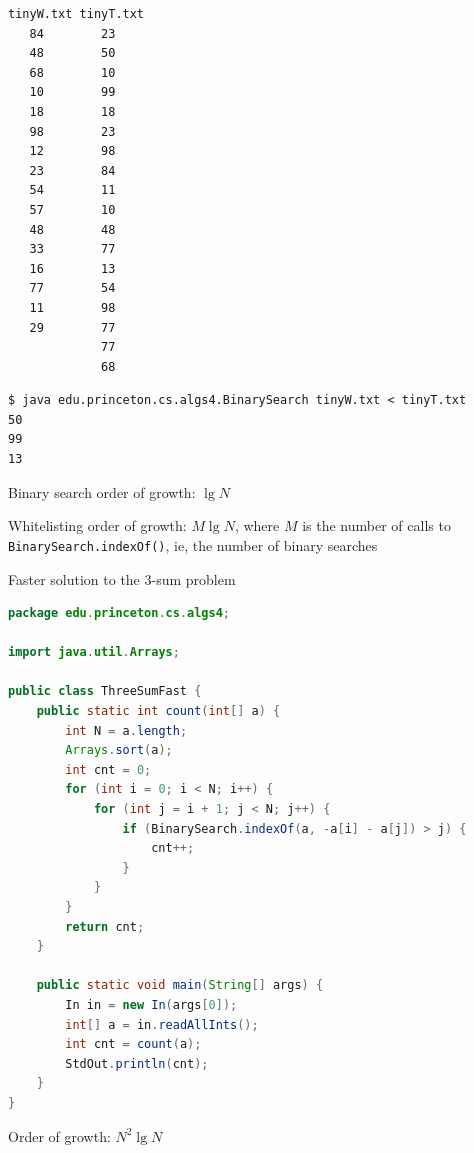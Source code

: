 \documentclass[8pt,a4paper,compress]{beamer}
\begin{document}
\begin{frame}[fragile]
\pause

\begin{lstlisting}[language={}]
tinyW.txt tinyT.txt
   84        23
   48        50
   68        10
   10        99
   18        18
   98        23
   12        98
   23        84
   54        11
   57        10
   48        48
   33        77
   16        13
   77        54
   11        98
   29        77
             77
             68
\end{lstlisting}

\pause

\begin{lstlisting}[language={}]
$ java edu.princeton.cs.algs4.BinarySearch tinyW.txt < tinyT.txt
50
99
13
\end{lstlisting}

\pause
\bigskip

Binary search order of growth: $\lg N$ 

\pause
\bigskip

Whitelisting order of growth: $M\lg N$, where $M$ is the number of calls to \lstinline{BinarySearch.indexOf()}, ie, the number of binary searches
\end{frame}

\begin{frame}[fragile]
\pause

Faster solution to the 3-sum problem
\begin{lstlisting}[language=Java]
package edu.princeton.cs.algs4;

import java.util.Arrays;

public class ThreeSumFast {
    public static int count(int[] a) {
        int N = a.length;
        Arrays.sort(a);
        int cnt = 0;
        for (int i = 0; i < N; i++) {
            for (int j = i + 1; j < N; j++) {
                if (BinarySearch.indexOf(a, -a[i] - a[j]) > j) {
                    cnt++;
                }
            }
        }
        return cnt;
    }
    
    public static void main(String[] args) {
        In in = new In(args[0]);
        int[] a = in.readAllInts();
        int cnt = count(a);
        StdOut.println(cnt);
    }
}
\end{lstlisting}

\pause

Order of growth: $N^2\lg N$
\end{frame}
\end{document}
